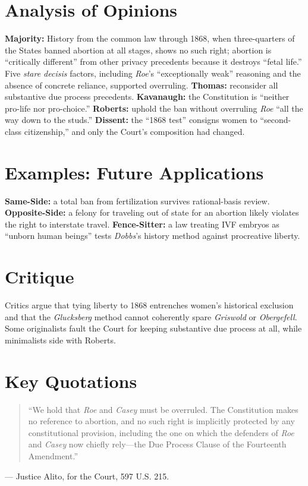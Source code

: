 \documentclass[12pt]{article}
\begin{document}
\section{Analysis of Opinions}
\textbf{Majority:} History from the common law through 1868, when three-quarters of the States banned abortion at all stages, shows no such right; abortion is ``critically different'' from other privacy precedents because it destroys ``fetal life.'' Five \textit{stare decisis} factors, including \textit{Roe}'s ``exceptionally weak'' reasoning and the absence of concrete reliance, supported overruling. \textbf{Thomas:} reconsider all substantive due process precedents. \textbf{Kavanaugh:} the Constitution is ``neither pro-life nor pro-choice.'' \textbf{Roberts:} uphold the ban without overruling \textit{Roe} ``all the way down to the studs.'' \textbf{Dissent:} the ``1868 test'' consigns women to ``second-class citizenship,'' and only the Court's composition had changed.

\section{Examples: Future Applications}
\textbf{Same-Side:} a total ban from fertilization survives rational-basis review. \textbf{Opposite-Side:} a felony for traveling out of state for an abortion likely violates the right to interstate travel. \textbf{Fence-Sitter:} a law treating IVF embryos as ``unborn human beings'' tests \textit{Dobbs}'s history method against procreative liberty.

\section{Critique}
Critics argue that tying liberty to 1868 entrenches women's historical exclusion and that the \textit{Glucksberg} method cannot coherently spare \textit{Griswold} or \textit{Obergefell}. Some originalists fault the Court for keeping substantive due process at all, while minimalists side with Roberts.

\section{Key Quotations}
\begin{quote}
``We hold that \textit{Roe} and \textit{Casey} must be overruled. The Constitution makes no reference to abortion, and no such right is implicitly protected by any constitutional provision, including the one on which the defenders of \textit{Roe} and \textit{Casey} now chiefly rely---the Due Process Clause of the Fourteenth Amendment.''
\end{quote}
\noindent --- Justice Alito, for the Court, 597 U.S. 215.
\end{document}
